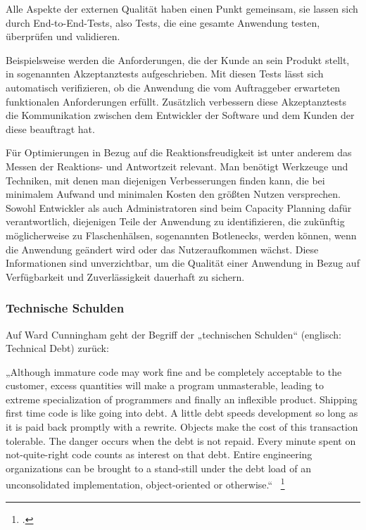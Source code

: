 Alle Aspekte der externen Qualität haben einen Punkt gemeinsam, sie lassen sich durch End-to-End-Tests, also Tests, die eine gesamte Anwendung testen, überprüfen und validieren.

Beispielsweise werden die Anforderungen, die der Kunde an sein Produkt stellt, in sogenannten Akzeptanztests aufgeschrieben. Mit diesen Tests lässt sich automatisch verifizieren, ob die Anwendung die vom Auftraggeber erwarteten funktionalen Anforderungen erfüllt. Zusätzlich verbessern diese Akzeptanztests die Kommunikation zwischen dem Entwickler der Software und dem Kunden der diese beauftragt hat.

Für Optimierungen in Bezug auf die Reaktionsfreudigkeit ist unter anderem das Messen der Reaktions- und Antwortzeit relevant. Man benötigt Werkzeuge und Techniken, mit denen man diejenigen 
Verbesserungen finden kann, die bei minimalem Aufwand und minimalen Kosten den größten Nutzen versprechen. Sowohl Entwickler als auch Administratoren sind beim Capacity Planning 
dafür verantwortlich, diejenigen Teile der Anwendung zu identifizieren, die zukünftig möglicherweise zu Flaschenhälsen, sogenannten Botlenecks, werden können, wenn die Anwendung geändert wird 
oder das Nutzeraufkommen wächst. Diese Informationen sind unverzichtbar, um die Qualität einer Anwendung in Bezug auf Verfügbarkeit und Zuverlässigkeit dauerhaft zu sichern.


\subsubsection{Technische Schulden}
Auf Ward Cunningham geht der Begriff der „technischen Schulden“ (englisch: Technical Debt) zurück:

„Although immature code may work fine and be completely acceptable to the customer,
excess quantities will make a program unmasterable, leading to extreme specialization 
of programmers and finally an inflexible product. Shipping first time code is
like going into debt. A little debt speeds development so long as it is paid back promptly
with a rewrite. Objects make the cost of this transaction tolerable. The danger occurs
when the debt is not repaid. Every minute spent on not-quite-right code counts as interest
on that debt. Entire engineering organizations can be brought to a stand-still 
under the debt load of an unconsolidated implementation, object-oriented or otherwise.“ ~\footcite[Vgl.]{website:ward:cunningham} %

